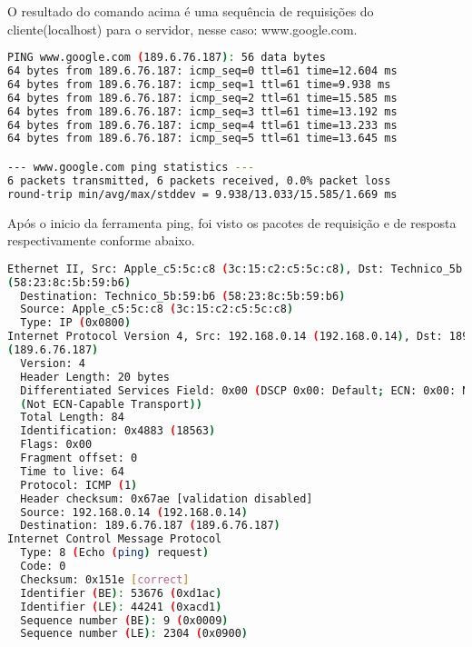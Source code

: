 \documentclass[a4paper]{report} %
\begin{document}
O resultado do comando acima é uma sequência de requisições do cliente(localhost) para o servidor, nesse caso: www.google.com.

\begin{lstlisting}[language=bash]
PING www.google.com (189.6.76.187): 56 data bytes
64 bytes from 189.6.76.187: icmp_seq=0 ttl=61 time=12.604 ms
64 bytes from 189.6.76.187: icmp_seq=1 ttl=61 time=9.938 ms
64 bytes from 189.6.76.187: icmp_seq=2 ttl=61 time=15.585 ms
64 bytes from 189.6.76.187: icmp_seq=3 ttl=61 time=13.192 ms
64 bytes from 189.6.76.187: icmp_seq=4 ttl=61 time=13.233 ms
64 bytes from 189.6.76.187: icmp_seq=5 ttl=61 time=13.645 ms

--- www.google.com ping statistics ---
6 packets transmitted, 6 packets received, 0.0% packet loss
round-trip min/avg/max/stddev = 9.938/13.033/15.585/1.669 ms
\end{lstlisting}

Após o inicio da ferramenta ping, foi visto os pacotes de requisição e de resposta respectivamente conforme abaixo.

\begin{lstlisting}[language=bash]
Ethernet II, Src: Apple_c5:5c:c8 (3c:15:c2:c5:5c:c8), Dst: Technico_5b:59:b6
(58:23:8c:5b:59:b6)
  Destination: Technico_5b:59:b6 (58:23:8c:5b:59:b6)
  Source: Apple_c5:5c:c8 (3c:15:c2:c5:5c:c8)
  Type: IP (0x0800)
Internet Protocol Version 4, Src: 192.168.0.14 (192.168.0.14), Dst: 189.6.76.187
(189.6.76.187)
  Version: 4
  Header Length: 20 bytes
  Differentiated Services Field: 0x00 (DSCP 0x00: Default; ECN: 0x00: Not-ECT
  (Not ECN-Capable Transport))
  Total Length: 84
  Identification: 0x4883 (18563)
  Flags: 0x00
  Fragment offset: 0
  Time to live: 64
  Protocol: ICMP (1)
  Header checksum: 0x67ae [validation disabled]
  Source: 192.168.0.14 (192.168.0.14)
  Destination: 189.6.76.187 (189.6.76.187)
Internet Control Message Protocol
  Type: 8 (Echo (ping) request)
  Code: 0
  Checksum: 0x151e [correct]
  Identifier (BE): 53676 (0xd1ac)
  Identifier (LE): 44241 (0xacd1)
  Sequence number (BE): 9 (0x0009)
  Sequence number (LE): 2304 (0x0900)
\end{lstlisting}
\end{document}
